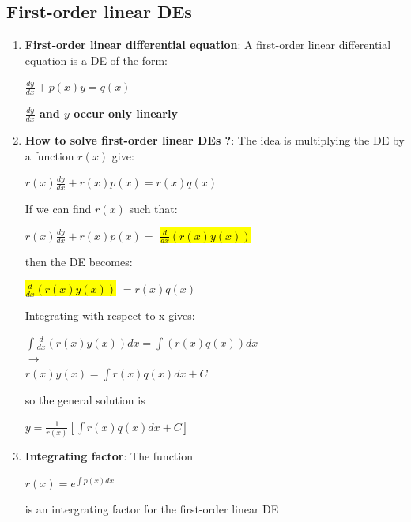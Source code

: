 \documentclass{article}
\begin{document}
    \subsection{First-order linear DEs}
      \begin{enumerate}
        \item \textbf{First-order linear differential equation}: A first-order linear differential equation is a DE of the form:
          \begin{center}
            $\frac{dy}{dx} + p(x) y = q(x)$
          \end{center}
          \textbf{$\frac{dy}{dx}$ and $y$ occur only linearly}

        \item \textbf{How to solve first-order linear DEs ?}: The idea is multiplying the DE by a function $r(x)$ give:
          \begin{center}
            $r(x) \frac{dy}{dx} + r(x)p(x) = r(x)q(x)$
          \end{center}

          If we can find $r(x)$ such that:
          \begin{center}
            $r(x) \frac{dy}{dx} + r(x)p(x) =$ \hl{$ \frac{d}{dx}(r(x)y(x))$}
          \end{center}

          then the DE becomes:
          \begin{center}
            \hl{$\frac{d}{dx}(r(x)y(x))$} $= r(x)q(x)$
          \end{center}

          Integrating with respect to x gives:
          \begin{center}
            $\int \frac{d}{dx}(r(x)y(x))dx = \int (r(x)q(x))dx$ \\
            $\rightarrow$ \\
            $r(x)y(x) = \int r(x)q(x)dx + C$

          \end{center}

          so the general solution is

          \begin{center}
            $y = \frac{1}{r(x)} [\int r(x)q(x) dx + C]$
          \end{center}

        \item \textbf{Integrating factor}: The function
          \begin{center}
            $r(x) = e^{\int p(x) dx}$
          \end{center}
          is an intergrating factor for the first-order linear DE


\end{enumerate}
\end{document}
